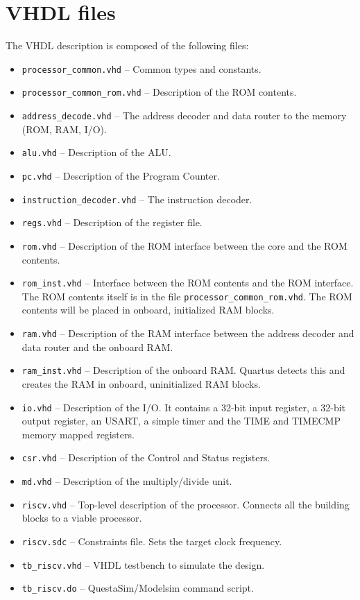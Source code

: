 \documentclass[12pt]{article}
\begin{document}
\section{VHDL files}
The VHDL description is composed of the following files:

\begin{itemize}
\item \lstinline|processor_common.vhd| -- Common types and constants.
\item \lstinline|processor_common_rom.vhd| -- Description of the ROM contents.
\item \lstinline|address_decode.vhd| -- The address decoder and data router to the memory (ROM, RAM, I/O).
\item \lstinline|alu.vhd| -- Description of the ALU.
\item \lstinline|pc.vhd| -- Description of the Program Counter.
\item \lstinline|instruction_decoder.vhd| -- The instruction decoder.
\item \lstinline|regs.vhd| -- Description of the register file.
\item \lstinline|rom.vhd| -- Description of the ROM interface between the core and the ROM contents.
\item \lstinline|rom_inst.vhd| -- Interface between the ROM contents and the ROM interface. The ROM contents itself is in the file \lstinline|processor_common_rom.vhd|. The ROM contents will be placed in onboard, initialized RAM blocks. 
\item \lstinline|ram.vhd| -- Description of the RAM interface between the address decoder and data router and the onboard RAM.
\item \lstinline|ram_inst.vhd| -- Description of the onboard RAM. Quartus detects this and creates the RAM in onboard, uninitialized RAM blocks.
\item \lstinline|io.vhd| -- Description of the I/O. It contains a 32-bit input register, a 32-bit output register, an USART, a simple timer and the TIME and TIMECMP memory mapped registers.
\item \lstinline|csr.vhd| -- Description of the Control and Status registers.
\item \lstinline|md.vhd| -- Description of the multiply/divide unit.
\item \lstinline|riscv.vhd| -- Top-level description of the processor. Connects all the building blocks to a viable processor.
\item \lstinline|riscv.sdc| -- Constraints file. Sets the target clock frequency.
\item \lstinline|tb_riscv.vhd| -- VHDL testbench to simulate the design.
\item \lstinline|tb_riscv.do| -- QuestaSim/Modelsim command script.
\end{itemize}
\end{document}
